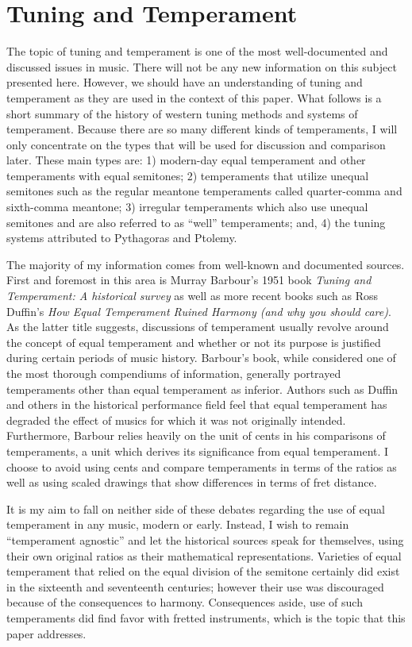 \chapter{Tuning and Temperament}

The topic of tuning and temperament is one of the most well-documented and discussed
issues in music.  There will not be any new information on this subject presented here.
However, we should have an understanding of tuning and temperament as they are used in the
context of this paper. What follows is a short summary of the history of western tuning
methods and systems of temperament.  Because there are so many different kinds of
temperaments, I will only concentrate on the types that will be used for discussion and
comparison later.  These main types are: 1) modern-day equal temperament and other
temperaments with equal semitones; 2) temperaments that utilize unequal
semitones such as the regular meantone temperaments called quarter-comma and sixth-comma
meantone; 3) irregular temperaments which also use unequal semitones and are also referred
to as ``well'' temperaments; and, 4) the tuning systems attributed to Pythagoras and
Ptolemy.

The majority of my information comes from well-known and documented sources.
First and foremost in this area is Murray Barbour's 1951 book \textit{Tuning and
Temperament: A historical survey} as well as more recent books such as Ross
Duffin's \textit{How Equal Temperament Ruined Harmony (and why you should
care)}.  As the latter title suggests, discussions of temperament usually
revolve around the concept of equal temperament and whether or not its purpose
is justified during certain periods of music history.  Barbour's book, while
considered one of the most thorough compendiums of information, generally
portrayed temperaments other than equal temperament as inferior. Authors such as
Duffin and others in the historical performance field feel that equal
temperament has degraded the effect of musics for which it was not originally
intended.  Furthermore, Barbour relies heavily on the unit of cents in his
comparisons of temperaments, a unit which derives its significance from equal
temperament.  I choose to avoid using cents and compare temperaments in terms of
the ratios as well as using scaled drawings that show differences in terms of
fret distance.

It is my aim to fall on neither side of these debates regarding the use
of equal temperament in any music, modern or early.  Instead, I wish to remain
``temperament agnostic'' and let the historical sources speak for themselves,
using their own original ratios as their mathematical representations.
Varieties of equal temperament that relied on the equal division of the
semitone certainly did exist in the sixteenth and seventeenth centuries;
however their use was discouraged because of the consequences to harmony.
Consequences aside, use of such temperaments did find favor with fretted
instruments, which is the topic that this paper addresses.

